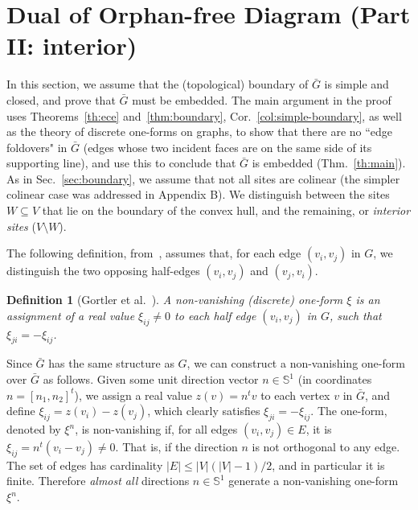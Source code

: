 \documentclass[11pt]{article}
\newtheorem{definition}[theorem]{Definition}
\begin{document}
\section{Dual of Orphan-free Diagram (Part II: interior)}\label{sec:interior}


In this section, we assume that the (topological) boundary of $\bar{G}$ is simple and closed, and prove that $\bar{G}$ must be embedded.
The main argument in the proof 
uses  Theorems~\ref{th:ece} and~\ref{thm:boundary}, Cor.~\ref{col:simple-boundary}, as well as 
the theory of discrete one-forms on graphs, 
to show that there are no
``edge foldovers" in $\bar{G}$ (edges whose two incident faces are on the same side of its supporting line), 
and use this to conclude that $\bar{G}$ is embedded (Thm.~\ref{th:main}). 
As in Sec.~\ref{sec:boundary}, we assume that not all sites are colinear 
(the simpler colinear case was addressed in Appendix B). We distinguish between the sites $W\subseteq V$ that lie on the boundary of the convex hull, and the remaining, or
\emph{interior sites} ($V\setminus W$). 



The following definition, from~\cite{1form}, 
assumes that, for each edge
$(v_i,v_j)$ in $G$, we distinguish the two opposing half-edges
$(v_i,v_j)$ and $(v_j,v_i)$. 


\begin{definition}[Gortler et al.\ \cite{1form}]\label{def:1form}
A non-vanishing (discrete) one-form $\xi$  is an assignment of a real value
$\xi_{ij} \neq 0$ to each half edge $(v_i,v_j)$ in $G$, such that 
$\xi_{ji} = -\xi_{ij}$. 
\end{definition}



Since $\bar{G}$ has the same structure as $G$, we can construct a non-vanishing one-form
over $\bar{G}$ as follows. 
Given some unit direction vector $n\in\mathbb{S}^1$
(in coordinates $n=\left[n_1,n_2\right]^t$), 
we assign a real
value $z(v) = n^t v$ to each vertex $v$ in $\bar{G}$, and define 
$\xi_{ij} = z(v_i) - z(v_j)$, which clearly satisfies 
$\xi_{ji} = -\xi_{ij}$. The one-form, denoted by $\xi^n$, 
is non-vanishing if, for all edges $(v_i,v_j)\in E$, 
it is $\xi_{ij} = n^t (v_i - v_j) \neq 0$. 
That is, if the direction $n$ is not orthogonal to any edge. 
The set of edges has cardinality $|E| \le |V| (|V|-1)/2$, and in particular
it is finite. Therefore \emph{almost all} directions $n\in\mathbb{S}^1$ generate a non-vanishing one-form $\xi^n$. 
\end{document}
